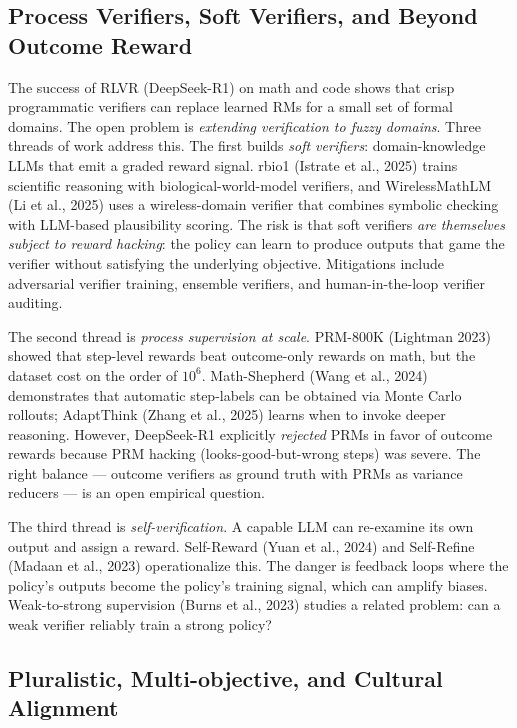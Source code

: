 \subsection{Process Verifiers, Soft Verifiers, and Beyond Outcome Reward}\label{process-verifiers-soft-verifiers-and-beyond-outcome-reward}

The success of RLVR (DeepSeek-R1) on math and code shows that crisp programmatic verifiers can replace learned RMs for a small set of formal domains. The open problem is \emph{extending verification to fuzzy domains}. Three threads of work address this. The first builds \emph{soft verifiers}: domain-knowledge LLMs that emit a graded reward signal. rbio1 (Istrate et al., 2025) trains scientific reasoning with biological-world-model verifiers, and WirelessMathLM (Li et al., 2025) uses a wireless-domain verifier that combines symbolic checking with LLM-based plausibility scoring. The risk is that soft verifiers \emph{are themselves subject to reward hacking}: the policy can learn to produce outputs that game the verifier without satisfying the underlying objective. Mitigations include adversarial verifier training, ensemble verifiers, and human-in-the-loop verifier auditing.

The second thread is \emph{process supervision at scale}. PRM-800K (Lightman 2023) showed that step-level rewards beat outcome-only rewards on math, but the dataset cost on the order of \(10^6\). Math-Shepherd (Wang et al., 2024) demonstrates that automatic step-labels can be obtained via Monte Carlo rollouts; AdaptThink (Zhang et al., 2025) learns when to invoke deeper reasoning. However, DeepSeek-R1 explicitly \emph{rejected} PRMs in favor of outcome rewards because PRM hacking (looks-good-but-wrong steps) was severe. The right balance --- outcome verifiers as ground truth with PRMs as variance reducers --- is an open empirical question.

The third thread is \emph{self-verification}. A capable LLM can re-examine its own output and assign a reward. Self-Reward (Yuan et al., 2024) and Self-Refine (Madaan et al., 2023) operationalize this. The danger is feedback loops where the policy's outputs become the policy's training signal, which can amplify biases. Weak-to-strong supervision (Burns et al., 2023) studies a related problem: can a weak verifier reliably train a strong policy?

\subsection{Pluralistic, Multi-objective, and Cultural Alignment}\label{pluralistic-multi-objective-and-cultural-alignment}


